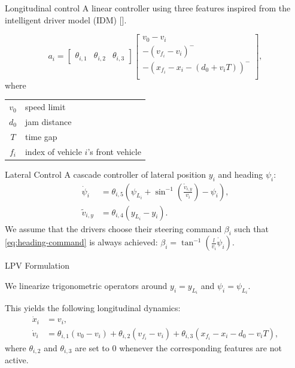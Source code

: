 \documentclass[slideopt,A4,showboxes,svgnames]{beamer}
\begin{document}
\begin{frame}{Longitudinal control}
A linear controller using three features inspired from the intelligent driver model (IDM) [\cite{Treiber2000}].

	\begin{equation*}
	a_i = \begin{bmatrix}
	\theta_{i,1} & \theta_{i,2} & \theta_{i,3}
	\end{bmatrix} \begin{bmatrix}
	v_0 - v_i \\
	-(v_{f_i}-v_i)^- \\
	-(x_{f_i} - x_i - (d_0 + v_iT))^- \\
	\end{bmatrix},
	\label{eq:theta_a}
	\end{equation*}
	where
	\begin{center}
	\begin{tabular}{cl}
    \toprule
    $v_0$ & speed limit \\
    $d_0$ & jam distance \\
    $T$ & time gap \\
    $f_i$ & index of vehicle $i$'s front vehicle\\
    \bottomrule
    \end{tabular}    
	\end{center}
	
\end{frame}

\begin{frame}{Lateral Control}
A cascade controller of lateral position $y_i$ and heading $\psi_i$:
\begin{align}
\label{eq:heading-command}
\dot{\psi}_i &= \theta_{i,5}\left(\psi_{L_i}+\sin^{-1}\left(\frac{\tilde{v}_{i,y}}{v_i}\right)-\psi_i\right),\\
\tilde{v}_{i,y} &= \theta_{i,4} (y_{L_i}-y_i). \nonumber
\end{align}
We assume that the drivers choose their steering command $\beta_i$ such that \eqref{eq:heading-command} is always achieved: $\beta_i = \tan^{-1}(\frac{l}{v_i}\dot{\psi}_i)$.
\end{frame}

\begin{frame}{LPV Formulation}

We linearize trigonometric operators around $y_i=y_{L_i}$ and $\psi_i=\psi_{L_i}$.

This yields the following longitudinal dynamics:
\begin{align*}
\dot{x}_i &= v_i,\\
\dot v_i &= \theta_{i,1} (v_0 - v_i) + \theta_{i,2} (v_{f_i} - v_i) + \theta_{i,3}(x_{f_i} - x_i - d_0 - v_i T),
\end{align*}
where $\theta_{i,2}$ and $\theta_{i,3}$ are set to $0$ whenever the corresponding features are not active.
\end{frame}
\end{document}
